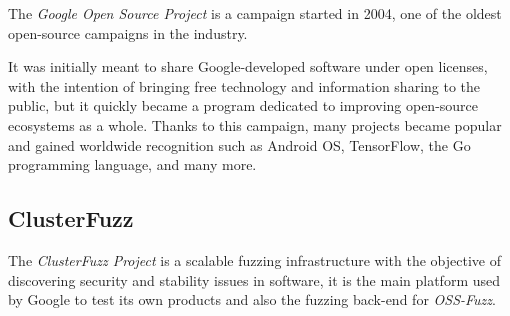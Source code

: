 The \textit{Google Open Source Project} \cite{google_oss} is a campaign started in 2004, one of the oldest open-source campaigns in the industry. 

It was initially meant to share Google-developed software under open licenses, with the intention of bringing free technology and information sharing to the public, but it quickly became a program dedicated to improving open-source ecosystems as a whole. 
Thanks to this campaign, many projects became popular and gained worldwide recognition such as Android OS, TensorFlow, the Go programming language, and many more.



\subsection{ClusterFuzz}
The \textit{ClusterFuzz Project} is a scalable fuzzing infrastructure with the objective of discovering security and stability issues in software, it is the main platform used by Google to test its own products and also the fuzzing back-end for \textit{OSS-Fuzz}.

